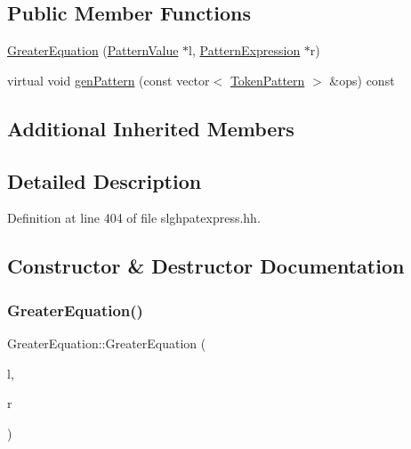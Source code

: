 \subsection*{Public Member Functions}
\begin{DoxyCompactItemize}
\item 
\mbox{\hyperlink{class_greater_equation_a61ad0d2603e2699294d62e59d448cfae}{Greater\+Equation}} (\mbox{\hyperlink{class_pattern_value}{Pattern\+Value}} $\ast$l, \mbox{\hyperlink{class_pattern_expression}{Pattern\+Expression}} $\ast$r)
\item 
virtual void \mbox{\hyperlink{class_greater_equation_a4ebd4be45c692f46fdfd252d2c8c3628}{gen\+Pattern}} (const vector$<$ \mbox{\hyperlink{class_token_pattern}{Token\+Pattern}} $>$ \&ops) const
\end{DoxyCompactItemize}
\subsection*{Additional Inherited Members}


\subsection{Detailed Description}


Definition at line 404 of file slghpatexpress.\+hh.



\subsection{Constructor \& Destructor Documentation}
\mbox{\label{class_greater_equation_a61ad0d2603e2699294d62e59d448cfae}} 
\subsubsection{\texorpdfstring{GreaterEquation()}{GreaterEquation()}}
{\footnotesize\ttfamily Greater\+Equation\+::\+Greater\+Equation (\begin{DoxyParamCaption}\item[{\mbox{\hyperlink{class_pattern_value}{Pattern\+Value}} $\ast$}]{l,  }\item[{\mbox{\hyperlink{class_pattern_expression}{Pattern\+Expression}} $\ast$}]{r }\end{DoxyParamCaption})\hspace{0.3cm}{\ttfamily [inline]}}



